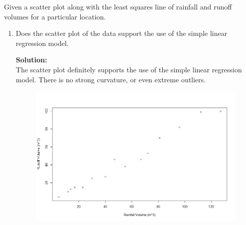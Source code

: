 \documentclass[12pt]{article}
\makeatletter
\theoremstyle{homework}
\newenvironment{exercise}[1]
{\def\@currentlabel{#1}\exercisecore}
{\endexercisecore}
\newcommand{\localhead}[1]{\par\smallskip\noindent\textbf{#1}\nobreak\\}%
\newcommand\solution{\localhead{Solution:}}
\makeatother
\begin{document}
\begin{exercise}{12.16} Given a scatter plot along with the least squares line of rainfall and runoff volumes for a particular location.\\
  \begin{enumerate}
    \item Does the scatter plot of the data support the use of the simple linear regression model.\\
    \solution The scatter plot definitely supports the use of the simple linear regression model. There is no strong curvature, or even extreme outliers.
    \begin{figure}[H]
      \includegraphics[width = \textwidth]{scatterplot.png}  
      \centering
    \end{figure}
    \vspace{.25in}



\end{enumerate}
\end{exercise}
\end{document}
